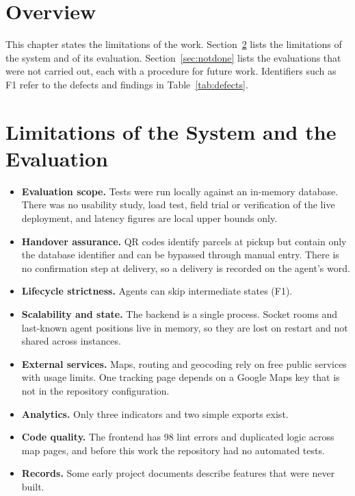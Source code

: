 \section{Overview}

This chapter states the limitations of the work. Section~\ref{sec:limits-list} lists the limitations of the system and of its evaluation. Section~\ref{sec:notdone} lists the evaluations that were not carried out, each with a procedure for future work. Identifiers such as F1 refer to the defects and findings in Table~\ref{tab:defects}.

\section{Limitations of the System and the Evaluation}
\label{sec:limits-list}

\begin{itemize}
  \item \textbf{Evaluation scope.} Tests were run locally against an in-memory database. There was no usability study, load test, field trial or verification of the live deployment, and latency figures are local upper bounds only.
  \item \textbf{Handover assurance.} QR codes identify parcels at pickup but contain only the database identifier and can be bypassed through manual entry. There is no confirmation step at delivery, so a delivery is recorded on the agent's word.
  \item \textbf{Lifecycle strictness.} Agents can skip intermediate states (F1).
  \item \textbf{Scalability and state.} The backend is a single process. Socket rooms and last-known agent positions live in memory, so they are lost on restart and not shared across instances.
  \item \textbf{External services.} Maps, routing and geocoding rely on free public services with usage limits. One tracking page depends on a Google Maps key that is not in the repository configuration.
  \item \textbf{Analytics.} Only three indicators and two simple exports exist.
  \item \textbf{Code quality.} The frontend has 98 lint errors and duplicated logic across map pages, and before this work the repository had no automated tests.
  \item \textbf{Records.} Some early project documents describe features that were never built.
\end{itemize}

